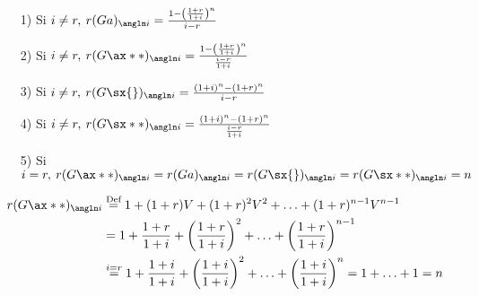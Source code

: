 \begin{proposition}
\hfill
\begin{enumerate}
\item[1)] Si $i\neq r, \: r(Ga)_{\angln i} = \frac{1- \left(\frac{1+r}{1+i} \right)^n }{i-r}$
\item[2)] Si $i\neq r, \: r(G\ax**{})_{\angln i} = \frac{1- \left(\frac{1+r}{1+i} \right)^n}{\frac{i-r}{1+i}}$
\item[3)] Si $i\neq r, \: r(G\sx{})_{\angln i} = \frac{(1+i)^n - (1+r)^n}{i-r}$
\item[4)] Si $i\neq r, \: r(G\sx**{})_{\angln i} = \frac{(1+i)^n - (1+r)^n}{\frac{i-r}{1+i}}$
\item[5)] Si $i= r,  \: r(G\ax**{})_{\angln i} = r(Ga)_{\angln i} = r(G\sx{})_{\angln i} = r(G\sx**{})_{\angln i} = n  $
\end{enumerate}
\end{proposition}
\begin{align*}
r(G\ax**{})_{\angln i}  &\mathrel{\stackon[1.5pt]{$=$}{$\scriptstyle \text{Def}$}} 1 + (1+r)V + (1+r)^2V^2 + \ldots + (1+r)^{n-1}V^{n-1}\\
&= 1 + \frac{1+r}{1+i} + \left(\frac{1+r}{1+i} \right)^2 + \ldots + \left( \frac{1+r}{1+i} \right)^{n-1}\\
& \mathrel{\stackon[1.5pt]{$=$}{$\scriptstyle i = r$}} 1 + \frac{1+i}{1+i} + \left(\frac{1+i}{1+i} \right)^2 + \ldots + \left(\frac{1+i}{1+i} \right)^n = 1+ \ldots + 1 = n  
\end{align*}
\color{blue}
\color{black}
